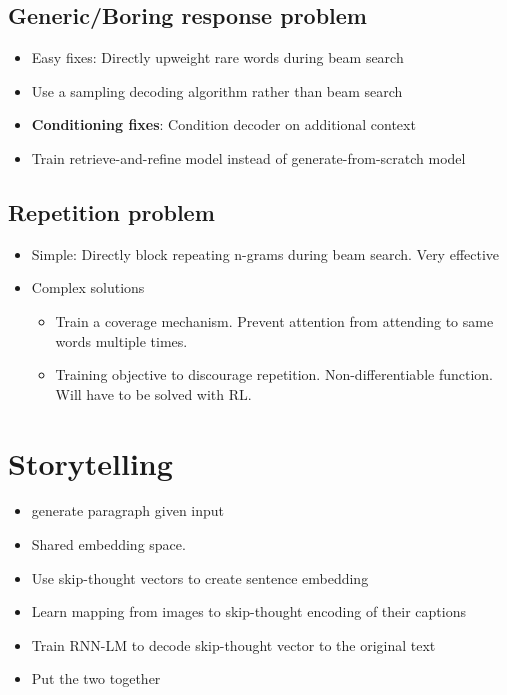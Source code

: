 \documentclass[a4paper]{article}
\begin{document}
\subsection{Generic/Boring response problem}
\begin{itemize}
    \item Easy fixes: Directly upweight rare words during beam search
    \item Use a sampling decoding algorithm rather than beam search
    \item \textbf{Conditioning fixes}: Condition decoder on additional context 
    \item Train retrieve-and-refine model instead of generate-from-scratch model
\end{itemize}
\subsection{Repetition problem}
\begin{itemize}
    \item Simple: Directly block repeating n-grams during beam search. Very effective
    \item Complex solutions
    \begin{itemize}
        \item Train a coverage mechanism. Prevent attention from attending to same words multiple times.
        \item Training objective to discourage repetition. Non-differentiable function. Will have to be solved with RL.
    \end{itemize}
\end{itemize}
\section{Storytelling}
\begin{itemize}
    \item generate paragraph given input
    \item Shared embedding space.
    \item Use skip-thought vectors to create sentence embedding
    \item Learn mapping from images to skip-thought encoding of their captions
    \item Train RNN-LM to decode skip-thought vector to the original text
    \item Put the two together
\end{itemize}
\end{document}
